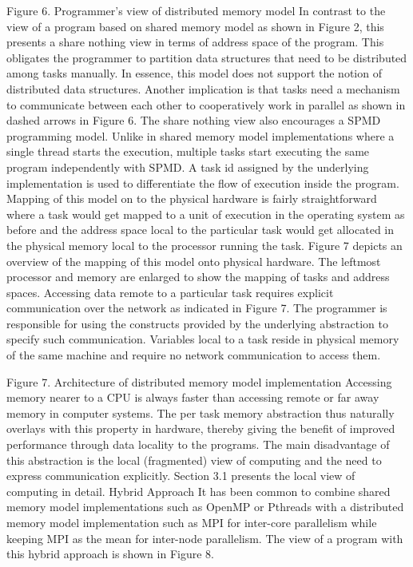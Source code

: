 Figure 6. Programmer's view of distributed memory model
In contrast to the view of a program based on shared memory model as shown in Figure 2, this presents a share nothing view in terms of address space of the program. This obligates the programmer to partition data structures that need to be distributed among tasks manually. In essence, this model does not support the notion of distributed data structures. Another implication is that tasks need a mechanism to communicate between each other to cooperatively work in parallel as shown in dashed arrows in Figure 6. 
The share nothing view also encourages a SPMD programming model. Unlike in shared memory model implementations where a single thread starts the execution, multiple tasks start executing the same program independently with SPMD. A task id assigned by the underlying implementation is used to differentiate the flow of execution inside the program. 
Mapping of this model on to the physical hardware is fairly straightforward where a task would get mapped to a unit of execution in the operating system as before and the address space local to the particular task would get allocated in the physical memory local to the processor running the task. Figure 7 depicts an overview of the mapping of this model onto physical hardware. The leftmost processor and memory are enlarged to show the mapping of tasks and address spaces.
Accessing data remote to a particular task requires explicit communication over the network as indicated in Figure 7. The programmer is responsible for using the constructs provided by the underlying abstraction to specify such communication. Variables local to a task reside in physical memory of the same machine and require no network communication to access them. 

 
Figure 7. Architecture of distributed memory model implementation
Accessing memory nearer to a CPU is always faster than accessing remote or far away memory in computer systems. The per task memory abstraction thus naturally overlays with this property in hardware, thereby giving the benefit of improved performance through data locality to the programs. The main disadvantage of this abstraction is the local (fragmented) view of computing and the need to express communication explicitly. Section 3.1 presents the local view of computing in detail.
Hybrid Approach
It has been common to combine shared memory model implementations such as OpenMP or Pthreads with a distributed memory model implementation such as MPI for inter-core parallelism while keeping MPI as the mean for inter-node parallelism. The view of a program with this hybrid approach is shown in Figure 8.
 
